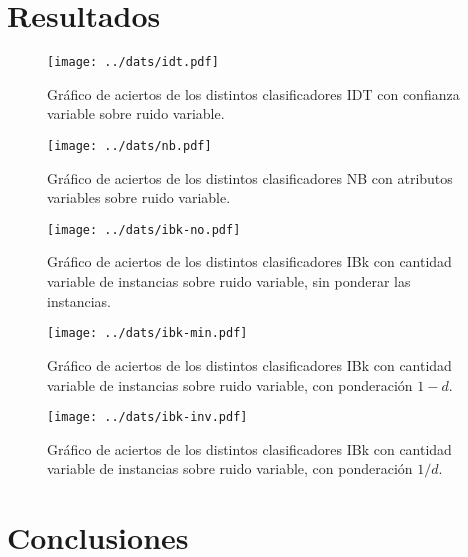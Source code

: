 \documentclass[a4paper,10pt]{article}
\begin{document}
\section{Resultados}

\begin{figure}
\centering
\texttt{[image: ../dats/idt.pdf]}
\caption{Gráfico de aciertos de los distintos clasificadores \textsf{IDT} con confianza variable sobre ruido variable.}
\end{figure}

\begin{figure}
\centering
\texttt{[image: ../dats/nb.pdf]}
\caption{Gráfico de aciertos de los distintos clasificadores \textsf{NB} con atributos variables sobre ruido variable.}
\end{figure}

\begin{figure}
\centering
\texttt{[image: ../dats/ibk-no.pdf]}
\caption{Gráfico de aciertos de los distintos clasificadores \textsf{IBk} con cantidad variable de instancias sobre ruido variable, sin ponderar las instancias.}
\end{figure}

\begin{figure}
\centering
\texttt{[image: ../dats/ibk-min.pdf]}
\caption{Gráfico de aciertos de los distintos clasificadores \textsf{IBk} con cantidad variable de instancias sobre ruido variable, con ponderación $1-d$.}
\end{figure}

\begin{figure}
\centering
\texttt{[image: ../dats/ibk-inv.pdf]}
\caption{Gráfico de aciertos de los distintos clasificadores \textsf{IBk} con cantidad variable de instancias sobre ruido variable, con ponderación $1/d$.}
\end{figure}
\section{Conclusiones}
\end{document}
